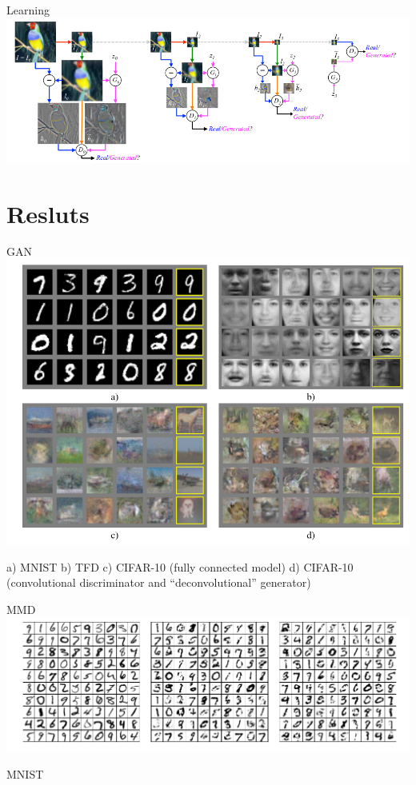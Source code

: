 \documentclass{beamer}
\begin{document}
\begin{frame}{Learning}
\includegraphics[width=\textwidth]{./img/learning.png}
\end{frame}

\section{Resluts}

\begin{frame}{GAN}
\includegraphics[width=\textwidth]{./img/ganRes.png}

a) MNIST b) TFD c) CIFAR-10 (fully connected model) d) CIFAR-10 (convolutional discriminator
and “deconvolutional” generator)
\end{frame}

\begin{frame}{MMD}
\includegraphics[width=\textwidth]{./img/mmd.png}

MNIST
\end{frame}
\end{document}
